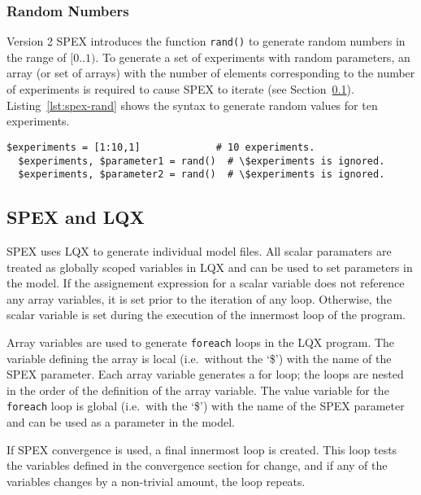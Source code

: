 \subsubsection{Random Numbers}

Version 2 SPEX introduces the function \texttt{rand()} to generate random numbers in the range of $[0..1)$.  To generate a set of experiments with
random parameters, an array (or set of arrays) with the number of elements corresponding to the number of
experiments is required to cause SPEX to iterate (see Section~\ref{sec:spex-and-lqx}).
Listing~\ref{lst:spex-rand} shows the syntax to generate random values for ten experiments.

\lstset{language=LQN,numbersep=10pt,firstnumber=1,texcl}
\begin{lstlisting}[float,caption={SPEX random parameter generation},label=lst:spex-rand]
  $experiments = [1:10,1]             # 10 experiments.
  $experiments, $parameter1 = rand()  # \$experiments is ignored.
  $experiments, $parameter2 = rand()  # \$experiments is ignored.
\end{lstlisting}


\subsection{SPEX and LQX}
\label{sec:spex-and-lqx}

SPEX uses LQX to generate individual model files.  All scalar paramaters are treated as globally
scoped variables in LQX and can be used to set parameters in the model.  If the assignement expression for a
scalar variable does not reference any array variables, it is set prior to the iteration of any loop.
Otherwise, the scalar variable is set during the execution of the innermost loop of the program.

Array variables are used to generate \texttt{foreach} loops in the LQX program.  The variable defining the
array is local (i.e.\ without the `\$') with the name of the SPEX parameter.  Each array variable generates
a for loop; the loops are nested in the order of the definition of the array variable.  The value variable
for the \texttt{foreach} loop is global (i.e.\ with the `\$') with the name of the SPEX parameter and can be
used as a parameter in the model.

If SPEX convergence is used, a final innermost loop is created.  This loop tests the variables defined in
the convergence section for change, and if any of the variables changes by a non-trivial amount, the loop
repeats.

